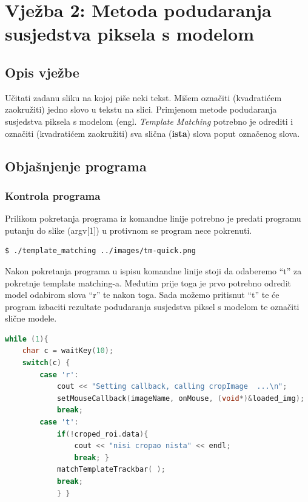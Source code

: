 \setcounter{figure}{0}
\setcounter{lstlisting}{0}
\section{Vježba 2: Metoda podudaranja susjedstva piksela s modelom}

\subsection{Opis vježbe}
Učitati zadanu sliku na kojoj piše neki tekst. Mišem označiti
(kvadratićem zaokružiti) jedno slovo u tekstu na slici. Primjenom metode
podudaranja susjedstva piksela s modelom (engl. \textit{Template
Matching} potrebno je odrediti i označiti (kvadratićem zaokružiti) sva
slična (\textbf{ista}) slova poput označenog slova.

\subsection{Objašnjenje programa}

\subsubsection{Kontrola programa}

Prilikom pokretanja programa iz komandne linije potrebno je 
predati programu putanju do slike (argv[1]) u protivnom se program 
nece pokrenuti. \\

\begin{lstlisting}[language=bash,caption={Pokretanje programa iz
    komandne linije}]
$ ./template_matching ../images/tm-quick.png
\end{lstlisting}

Nakon pokretanja programa u ispisu komandne linije stoji da odaberemo
``t'' za pokretnje template matching-a. Međutim prije toga je prvo
potrebno odredit model odabirom slova ``r'' te nakon toga. Sada možemo
pritisnut ``t'' te će program izbaciti rezultate podudaranja susjedstva
piksel s modelom te označiti slične modele.
\\

\begin{lstlisting}[language=C,caption={Kontrola programa tipkovnicom}]
while (1){
    char c = waitKey(10);
    switch(c) {
        case 'r':
            cout << "Setting callback, calling cropImage  ...\n";
            setMouseCallback(imageName, onMouse, (void*)&loaded_img);
            break;
        case 't':
            if(!croped_roi.data){
                cout << "nisi cropao nista" << endl;
                break; }
            matchTemplateTrackbar( );
            break;
            } }
\end{lstlisting}

